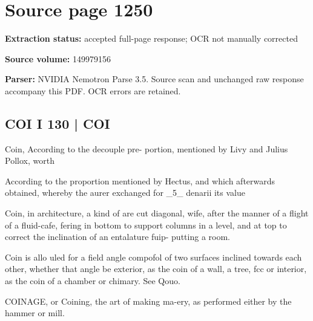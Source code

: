 \clearpage
\section{Source page 1250}
\textbf{Extraction status:} accepted full-page response; OCR not manually corrected\par
\textbf{Source volume:} 149979156\par
\textbf{Parser:} NVIDIA Nemotron Parse 3.5. Source scan and unchanged raw response accompany this PDF. OCR errors are retained.\par\medskip
\subsection*{COI I 130 | COI}
Coin,
According to the decouple pre-
portion, mentioned by Livy and Julius Pollox, worth\par\medskip
According to the proportion mentioned by Hectus, and which afterwards obtained, whereby the aurer exchanged for \_5\_ denarii its value\par\medskip
Coin, in architecture, a kind of are cut diagonal, wife, after the manner of a flight of a fluid-cafe, fering in bottom to support columns in a level, and at top to correct the inclination of an entalature fuip- putting a room.\par\medskip
Coin is allo uled for a field angle compofol of two surfaces inclined towards each other, whether that angle be exterior, as the coin of a wall, a tree, fcc or interior, as the coin of a chamber or chimary. See Qouo.\par\medskip
COINAGE, or Coining, the art of making ma-ery, as performed either by the hammer or mill.\par\medskip
